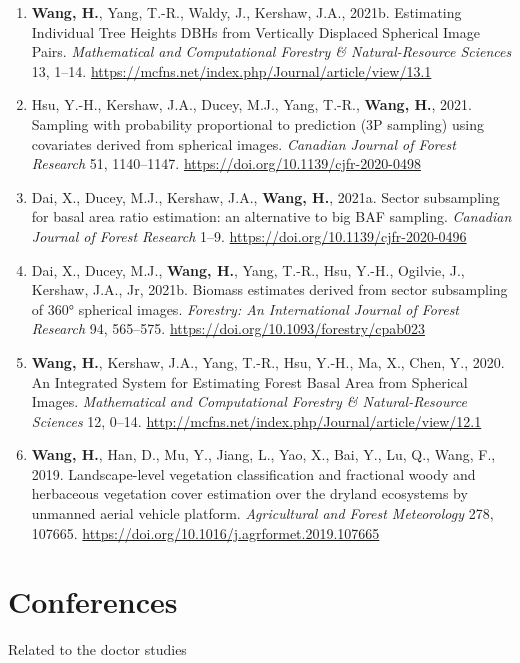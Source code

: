\begin{enumerate}
  \item \textbf{Wang, H.}, Yang, T.-R., Waldy, J., Kershaw, J.A., 2021b. Estimating Individual Tree Heights DBHs from Vertically Displaced Spherical Image Pairs. \textit{Mathematical and Computational Forestry \& Natural-Resource Sciences} 13, 1–14. \url{https://mcfns.net/index.php/Journal/article/view/13.1}
  \item Hsu, Y.-H., Kershaw, J.A., Ducey, M.J., Yang, T.-R., \textbf{Wang, H.}, 2021. Sampling with probability proportional to prediction (3P sampling) using covariates derived from spherical images. \textit{Canadian Journal of Forest Research} 51, 1140–1147. \url{https://doi.org/10.1139/cjfr-2020-0498}
  \item Dai, X., Ducey, M.J., Kershaw, J.A., \textbf{Wang, H.}, 2021a. Sector subsampling for basal area ratio estimation: an alternative to big BAF sampling. \textit{Canadian Journal of Forest Research} 1–9. \url{https://doi.org/10.1139/cjfr-2020-0496}
  \item Dai, X., Ducey, M.J., \textbf{Wang, H.}, Yang, T.-R., Hsu, Y.-H., Ogilvie, J., Kershaw, J.A., Jr, 2021b. Biomass estimates derived from sector subsampling of 360° spherical images. \textit{Forestry: An International Journal of Forest Research} 94, 565–575. \url{https://doi.org/10.1093/forestry/cpab023}
  \item \textbf{Wang, H.}, Kershaw, J.A., Yang, T.-R., Hsu, Y.-H., Ma, X., Chen, Y., 2020. An Integrated System for Estimating Forest Basal Area from Spherical Images. \textit{Mathematical and Computational Forestry \& Natural-Resource Sciences} 12, 0–14. \url{http://mcfns.net/index.php/Journal/article/view/12.1}
  \item \textbf{Wang, H.}, Han, D., Mu, Y., Jiang, L., Yao, X., Bai, Y., Lu, Q., Wang, F., 2019. Landscape-level vegetation classification and fractional woody and herbaceous vegetation cover estimation over the dryland ecosystems by unmanned aerial vehicle platform. \textit{Agricultural and Forest Meteorology} 278, 107665. \url{https://doi.org/10.1016/j.agrformet.2019.107665}
\end{enumerate}

\section*{Conferences}

\noindent
Related to the doctor studies

